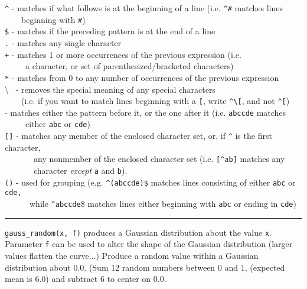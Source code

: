 \texttt{\^{}} - matches if what follows is at the beginning of
a line (i.e. \texttt{\^{}\#} matches lines \ \\
 \ \ \ \ beginning with
\texttt{{\textquotedbl}\#{\textquotedbl}})\\
\texttt{\$} - matches if the preceding pattern is at the end of a
line\\
\texttt{.} - matches any single character\\
\texttt{+} - matches 1 or more occurrences of the previous
expression (i.e. \\
 \ \ \ \ \ a character, or set of parenthesized/bracketed
characters)\\
\texttt{*} - matches from 0 to any number of occurrences of the previous
expression\\
{\textbackslash} \ {}- removes the special meaning of any special
characters\\
 \ \ \ \ (i.e. if you want to match lines beginning with a
\texttt{{\textquotedbl}[{\textquotedbl}}, write
\texttt{\^{}{\textbackslash}[}, and not \texttt{\^{}[})\\
\texttt{{\textbar}} - matches either the pattern before it, or the one
after it (i.e. \texttt{abc{\textbar}cde} matches\\
 \ \ \ \ \  either \texttt{abc} or \texttt{cde})\\
\texttt{[]} - matches any member of the enclosed character set, or, if
\texttt{\^{}} is the first character,\\
 \ \ \ \ \ \ \ any nonmember of the enclosed character set (i.e.
\texttt{[\^{}ab]} matches any
\\
 \ \ \ \ \ \ \ character \textit{except} \texttt{a} and \texttt{b}).\\
\texttt{()} - used for grouping (e.g. \texttt{\^{}(abc{\textbar}cde)\$} matches
lines consisting of either \texttt{{\textquotedbl}abc{\textquotedbl}}
or \texttt{{\textquotedbl}cde{\textquotedbl},}\\
 \ \ \ \ \ \ while \texttt{\^{}abc{\textbar}cde}\$ matches lines either
beginning with \texttt{{\textquotedbl}abc{\textquotedbl}} or ending in
\texttt{{\textquotedbl}cde{\textquotedbl}})

\vspace{0.25cm}\hrule{}

\texttt{gauss\_random(x, f)} produces a Gaussian distribution about the value \texttt{x}.
Parameter \texttt{f} can be used to alter the shape of the Gaussian
distribution (larger values flatten the curve...) Produce a random
value within a Gaussian distribution about 0.0. (Sum 12 random numbers
between 0 and 1, (expected mean is 6.0) and subtract 6 to center on 0.0.

